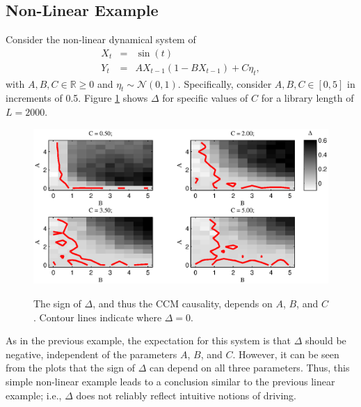 \documentclass[twocolumn,aps,pre,groupedaddress]{revtex4-1}
\begin{document}
\subsection{Non-Linear Example}
Consider the non-linear dynamical system of
\begin{eqnarray}
\label{eqn:nonlinearEX}
X_t &=& \sin(t)\\
Y_t &=& AX_{t-1}\left(1-BX_{t-1}\right)+C\eta_t,
\end{eqnarray}
with $A,B,C\in\mathbb{R}\ge 0$ and $\eta_t\sim\mathcal{N}\left(0,1\right)$.  Specifically, consider $A,B,C\in[0,5]$ in increments of 0.5.  Figure \ref{fig:nonlinearex} shows $\Delta$ for specific values of $C$ for a library length of $L=2000$.
\begin{figure}[ht]
\includegraphics[scale=0.5]{NonLinearEx.eps} \\
\caption{The sign of $\Delta$, and thus the CCM causality, depends on $A$, $B$, and $C$. Contour lines indicate where $\Delta=0$.}
\label{fig:nonlinearex}
\end{figure}
As in the previous example, the expectation for this system is that $\Delta$ should be negative, independent of the parameters $A$, $B$, and $C$.  However, it can be seen from the plots that the sign of $\Delta$ can depend on all three parameters.  Thus, this simple non-linear example leads to a conclusion similar to the previous linear example; i.e., $\Delta$ does not reliably reflect intuitive notions of driving.
\end{document}
